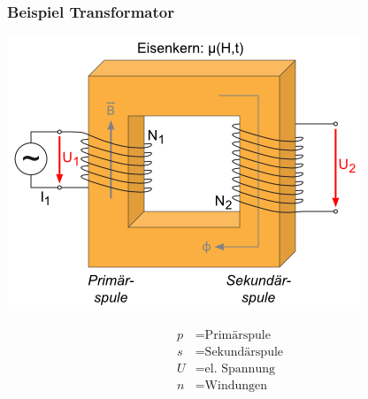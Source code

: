     \subsubsection{Beispiel Transformator}
        \begin{minipage}{0.49\linewidth}
            \includegraphics[width = \linewidth]{src/images/transformator.png}
        \end{minipage}
        \begin{minipage}{0.49\linewidth}
            \begin{scriptsize}
                \begin{align*}
                    p &= \text{Primärspule}\\
                    s &= \text{Sekundärspule}\\
                    U &= \text{el. Spannung}\\
                    n &= \text{Windungen}
                \end{align*}
            \end{scriptsize}
        \end{minipage}
%
